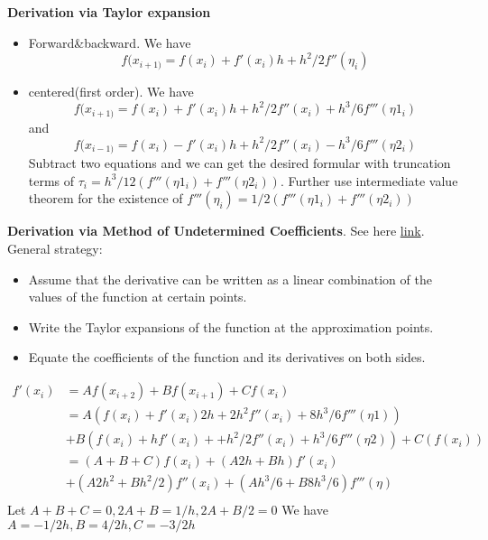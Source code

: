 \begin{refsection}
\begin{remark}
	\textbf{Derivation via Taylor expansion}\\
	\begin{itemize}
		\item Forward\&backward. We have $$f(x_{i+1)} = f(x_i) + f'(x_i)h + h^2/2 f''(\eta_i)$$
		\item centered(first order). We have $$f(x_{i+1)} = f(x_i) + f'(x_i)h + h^2/2 f''(x_i) + h^3/6 f'''(\eta1_i)$$ and 
		$$f(x_{i-1)} = f(x_i)  -f'(x_i)h + h^2/2 f''(x_i) - h^3/6 f'''(\eta2_i)$$ Subtract two equations and we can get the desired formular with truncation terms of $\tau_i = h^3/12 (f'''(\eta1_i) + f'''(\eta2_i))$. Further use intermediate value theorem for the existence of $f'''(\eta_i) = 1/2(f'''(\eta1_i) + f'''(\eta2_i))$ 
	\end{itemize}
\end{remark}

\begin{remark}
	\textbf{Derivation via Method of Undetermined Coefficients}. See here \href{http://www2.math.umd.edu/~dlevy/classes/amsc466/lecture-notes/differentiation-chap.pdf}{link}.\\
	General strategy:
	\begin{itemize}
		\item Assume that the derivative can be written as a linear combination of the values of the function at certain points.
		\item Write the Taylor expansions of the function at the approximation points.
		\item Equate the coefficients of the function and its derivatives on both sides.
	\end{itemize}
	
	
\end{remark}
\begin{example}
	\begin{align*}
	f'(x_i) &= Af(x_{i+2}) + Bf(x_{i+1}) + Cf(x_i)\\
	&= A(f(x_i) + f'(x_i)2h + 2h^2 f''(x_i) + 8h^3/6 f'''(\eta1))\\& + B(f(x_{i}) + hf'(x_i) + +h^2/2f''(x_i) +  h^3/6f'''(\eta2)) + C(f(x_i))\\
	& = (A + B + C)f(x_i) + (A2h + Bh)f'(x_i) \\&+ (A2h^2 + Bh^2/2) f''(x_i) + (Ah^3/6+B8h^3/6) f'''(\eta)\\
	\end{align*}
	Let $A+B+C=0, 2A + B = 1/h, 2A + B/2 = 0$
	We have $A = -1/2h, B = 4/2h, C=-3/2h$
\end{example}




\end{refsection}
